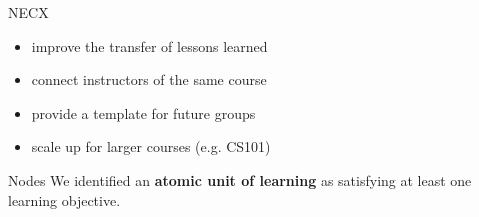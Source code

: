 \documentclass[final]{beamer}
\newlength{\onecolwid}
\newlength{\threecolwid}
\begin{document}
\begin{frame}[t]
\begin{columns}[t,totalwidth=\threecolwid]
\begin{column}{\onecolwid}
\begin{block}{NECX}
        \begin{itemize}
                \item improve the transfer of lessons learned 
                \item connect instructors of the same course
                \item provide a template for future groups 
                \item scale up for larger courses (e.g. CS101)
        \end{itemize}
%
%
\end{block}


\begin{block}{Nodes}
        We identified an \textbf{atomic unit of learning} as
        satisfying at least one learning objective. 


\end{block}
\end{column}
\end{columns}
\end{frame}
\end{document}
